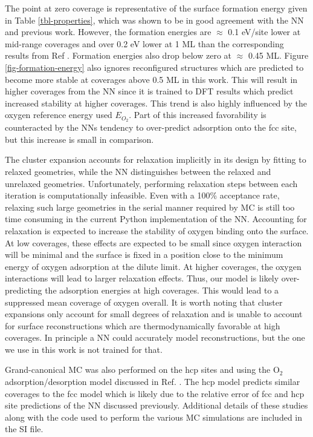 \documentclass[12pt]{cmuthesis}
\begin{document}
The point at zero coverage is representative of the surface formation energy given in Table \ref{tbl-properties}, which was shown to be in good agreement with the NN and previous work. However, the formation energies are \(\approx\) 0.1 eV/site lower at mid-range coverages and over 0.2 eV lower at 1 ML than the corresponding results from Ref . Formation energies also drop below zero at \(\approx\) 0.45 ML. Figure \ref{fig-formation-energy} also ignores reconfigured structures which are predicted to become more stable at coverages above 0.5 ML in this work. This will result in higher coverages from the NN since it is trained to DFT results which predict increased stability at higher coverages. This trend is also highly influenced by the oxygen reference energy used \(E_{O_{2}}\). Part of this increased favorability is counteracted by the NNs tendency to over-predict adsorption onto the fcc site, but this increase is small in comparison.

The cluster expansion accounts for relaxation implicitly in its design by fitting to relaxed geometries, while the NN distinguishes between the relaxed and unrelaxed geometries. Unfortunately, performing relaxation steps between each iteration is computationally infeasible. Even with a 100\% acceptance rate, relaxing such large geometries in the serial manner required by MC is still too time consuming in the current Python implementation of the NN. Accounting for relaxation is expected to increase the stability of oxygen binding onto the surface. At low coverages, these effects are expected to be small since oxygen interaction will be minimal and the surface is fixed in a position close to the minimum energy of oxygen adsorption at the dilute limit. At higher coverages, the oxygen interactions will lead to larger relaxation effects. Thus, our model is likely over-predicting the adsorption energies at high coverages. This would lead to a suppressed mean coverage of oxygen overall. It is worth noting that cluster expansions only account for small degrees of relaxation and is unable to account for surface reconstructions which are thermodynamically favorable at high coverages. In principle a NN could accurately model reconstructions, but the one we use in this work is not trained for that.

Grand-canonical MC was also performed on the hcp sites and using the O\(_{\text{2}}\) adsorption/desorption model discussed in Ref. . The hcp model predicts similar coverages to the fcc model which is likely due to the relative error of fcc and hcp site predictions of the NN discussed previously. Additional details of these studies along with the code used to perform the various MC simulations are included in the SI file.
\end{document}
